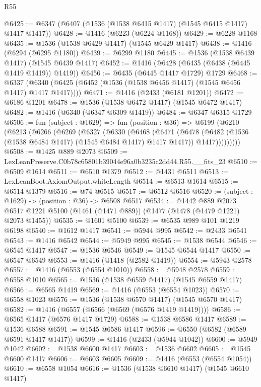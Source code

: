 \begin{lexlean}{R55}
\begin{coremodule}
{{@6425 := @6347 (@6407 (@1536 (@1538 @6415 @1417) (@1545 @6415 @1417) @1417 @1417))
@6428 := @1416 (@6223 (@6224 @1168))
@6429 := @6228 @1168
@6435 := @1536 (@1538 @6429 @1417) (@1545 @6429 @1417)
@6438 := @1416 (@6294 (@6295 @1180))
@6439 := @6299 @1180
@6445 := @1536 (@1538 @6439 @1417) (@1545 @6439 @1417)
@6452 := @1416 (@6428 (@6435 (@6438 (@6445 @1419 @1419)) @1419))
@6456 := @6435 (@6445 @1417 @1729) @1729
@6468 := @6337 (@6340 (@6425 (@6452 (@1536 (@1538 @6456 @1417) (@1545 @6456 @1417) @1417 @1417))))
@6471 := @1416 (@2433 (@6181 @1201))
@6472 := @6186 @1201
@6478 := @1536 (@1538 @6472 @1417) (@1545 @6472 @1417)
@6482 := @1416 (@6340 (@6347 @6309 @1419))
@6484 := @6347 @6315 @1729
@6506 := fun (subject : @1629) =>
  fun (position : @36) =>
  @6199
    (@6210
      (@6213
        (@6266
          (@6269
            (@6327
              (@6330
                (@6468
                  (@6471
                    (@6478
                      (@6482 (@1536 (@1538 @6484 @1417) (@1545 @6484 @1417) @1417 @1417))
                      @1417)))))))))
@6508 := @1425 @889 @2073
@6509 := LexLeanPreserve.C0b78c65801b39044e96a0b3235c2dd44.R55.__fits_23
@6510 := @6509 @1614
@6511 := @6510 @1379
@6512 := @1431 @6511
@6513 := LexLeanBoot.AxiomOutput.whiteLength
@6514 := @6513 @1614
@6515 := @6514 @1379
@6516 := @74 @6515
@6517 := @6512 @6516
@6520 := (subject : @1629) -> (position : @36) -> @6508 @6517
@6534 := @1442
    @889
    @2073
    @6517
    @1221
    @5100
    (@1461 (@1471 @889))
    (@1477 (@1478 (@1479 @1221) @2073 @1455))
@6535 := @1601 @5100
@6539 := @6535 @989 @101 @1219 @6198
@6540 := @1612 @1417
@6541 := @5944 @995
@6542 := @2433 @6541
@6543 := @1416 @6542
@6544 := @5949 @995
@6545 := @1538 @6544
@6546 := @6545 @1417
@6547 := @1536 @6546
@6549 := @1545 @6544 @1417
@6550 := @6547 @6549
@6553 := @1416 (@1418 (@2582 @1419))
@6554 := @5943 @2578
@6557 := @1416 (@6553 (@6554 @1010))
@6558 := @5948 @2578
@6559 := @6558 @1010
@6565 := @1536 (@1538 @6559 @1417) (@1545 @6559 @1417)
@6566 := @6565 @1419
@6569 := @1416 (@6553 (@6554 @1023))
@6570 := @6558 @1023
@6576 := @1536 (@1538 @6570 @1417) (@1545 @6570 @1417)
@6582 := @1416 (@6557 (@6566 (@6569 (@6576 @1419 @1419))))
@6586 := @6565 @1417 (@6576 @1417 @1729)
@6588 := @1538 @6586 @1417
@6589 := @1536 @6588
@6591 := @1545 @6586 @1417
@6596 := @6550 (@6582 (@6589 @6591 @1417 @1417))
@6599 := @1416 (@2433 (@5944 @1042))
@6600 := @5949 @1042
@6602 := @1538 @6600 @1417
@6603 := @1536 @6602
@6605 := @1545 @6600 @1417
@6606 := @6603 @6605
@6609 := @1416 (@6553 (@6554 @1054))
@6610 := @6558 @1054
@6616 := @1536 (@1538 @6610 @1417) (@1545 @6610 @1417)
}}
\end{coremodule}
\end{lexlean}
